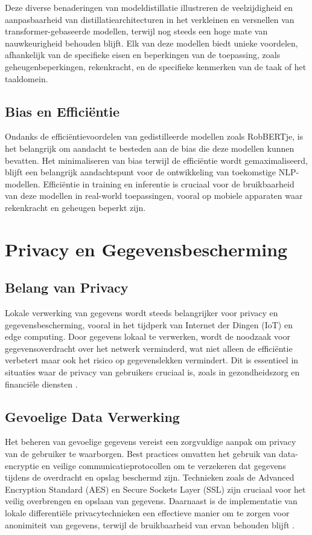 Deze diverse benaderingen van modeldistillatie illustreren de veelzijdigheid en aanpasbaarheid van distillatiearchitecturen in het verkleinen en versnellen van trans\-for\-mer-gebaseerde modellen, terwijl nog steeds een hoge mate van nauwkeurigheid behouden blijft. Elk van deze modellen biedt unieke voordelen, afhankelijk van de specifieke eisen en beperkingen van de toepassing, zoals geheugenbeperkingen, rekenkracht, en de specifieke kenmerken van de taak of het taaldomein.


\subsection{Bias en Efficiëntie}

Ondanks de efficiëntievoordelen van gedistilleerde modellen zoals RobBERTje, is het belangrijk om aandacht te besteden aan de bias die deze modellen kunnen bevatten. Het minimaliseren van bias terwijl de efficiëntie wordt gemaximaliseerd, blijft een belangrijk aandachtspunt voor de ontwikkeling van toekomstige NLP-modellen. Efficiëntie in training en inferentie is cruciaal voor de bruikbaarheid van deze modellen in real-world toepassingen, vooral op mobiele apparaten waar rekenkracht en geheugen beperkt zijn.


\section{Privacy en Gegevensbescherming}

\subsection{Belang van Privacy}

Lokale verwerking van gegevens wordt steeds belangrijker voor privacy en gegevensbescherming, vooral in het tijdperk van Internet der Dingen (IoT) en edge computing. Door gegevens lokaal te verwerken, wordt de noodzaak voor gegevensoverdracht over het netwerk verminderd, wat niet alleen de efficiëntie verbetert maar ook het risico op gegevenslekken vermindert. Dit is essentieel in situaties waar de privacy van gebruikers cruciaal is, zoals in gezondheidszorg en financiële diensten \autocite{Bi2020}.

\subsection{Gevoelige Data Verwerking}

Het beheren van gevoelige gegevens vereist een zorgvuldige aanpak om privacy van de gebruiker te waarborgen. Best practices omvatten het gebruik van data-encryptie en veilige communicatieprotocollen om te verzekeren dat gegevens tijdens de overdracht en opslag beschermd zijn. Technieken zoals de Advanced Encryption Standard (AES) en Secure Sockets Layer (SSL) zijn cruciaal voor het veilig overbrengen en opslaan van gegevens. Daarnaast is de implementatie van lokale differentiële privacytechnieken een effectieve manier om te zorgen voor anonimiteit van gegevens, terwijl de bruikbaarheid van ervan behouden blijft \autocite{Shah2014}.

